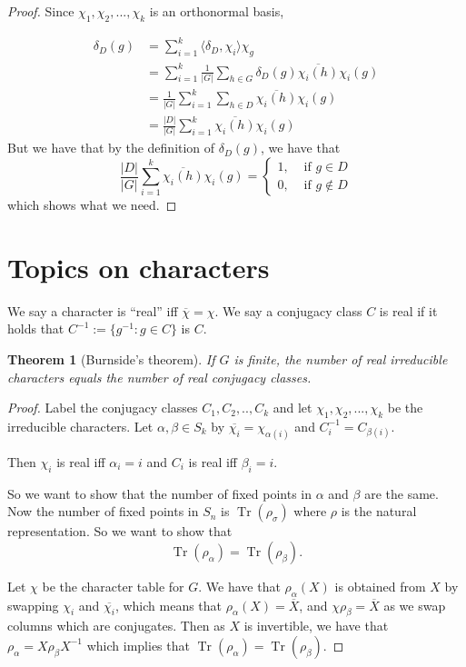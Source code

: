 \documentclass[]{report}
\newtheorem{theorem}{Theorem}
\theoremstyle{definition}
\numberwithin{theorem}{section}
\numberwithin{equation}{section}
\newcommand{\tr}{\operatorname{Tr}}
\begin{document}
\begin{proof}
	Since $\chi_1, \chi_2, ..., \chi_k$ is an orthonormal basis,
	
	\begin{align*}
		\delta_D(g) &= \sum_{i = 1}^k \langle \delta_D, \chi_i \rangle \chi_g\\
		&= \sum_{i = 1}^k \frac{1}{|G|} \sum_{h \in G} \delta_D(g) \overline{\chi_i(h)} \chi_i(g)\\
		&= \frac{1}{|G|}\sum_{i = 1}^k \sum_{h \in D} \overline{\chi_i(h)} \chi_i(g)\\
		&= \frac{|D|}{|G|}\sum_{i = 1}^k \overline{\chi_i(h)} \chi_i(g)
	\end{align*}
	But we have that by the definition of $\delta_D(g)$, we have that 
	\begin{equation}
		\frac{|D|}{|G|}\sum_{i = 1}^k \overline{\chi_i(h)} \chi_i(g) = \begin{cases}
			1, & \text{ if } g \in D\\
			0, & \text{ if } g \notin D
		\end{cases}
	\end{equation}
	which shows what we need. 
\end{proof}
\section{Topics on characters}

We say a character is ``real'' iff $\overline{\chi} = \chi$. We say a conjugacy class $C$ is real if it holds that $C^{-1} := \{g^{-1}: g \in C\}$ is $C$.

\begin{theorem}[Burnside's theorem]
	If $G$ is finite, the number of real irreducible characters equals the number of real conjugacy classes.
\end{theorem}

\begin{proof}
	Label the conjugacy classes $C_1, C_2, .., C_k$ and let $\chi_1, \chi_2, ..., \chi_k$ be the irreducible characters. Let $\alpha, \beta \in S_k$ by $\overline{\chi_i} = \chi_{\alpha(i)}$ and $C_i^{-1} = C_{\beta(i)}$.
	
	Then $\chi_i$ is real iff $\alpha_i = i$ and $C_i$ is real iff $\beta_i = i$.
	
	So we want to show that the number of fixed points in $\alpha$ and $\beta$ are the same. Now the number of fixed points in $S_n$ is $\tr(\rho_\sigma)$ where $\rho$ is the natural representation. So we want to show that
	\begin{equation}
		\tr(\rho_\alpha) = \tr(\rho_\beta).
	\end{equation}
	
	Let $\chi$ be the character table for $G$. We have that $\rho_\alpha(X)$ is obtained from $X$ by swapping $\chi_i$ and $\overline{\chi_i}$, which means that $\rho_\alpha(X) = \overline{X}$, and $\chi \rho_\beta = \overline{X}$ as we swap columns which are conjugates. Then as $X$ is invertible, we have that $\rho_\alpha = X \rho_\beta X^{-1}$ which implies that $\tr(\rho_\alpha) = \tr(\rho_\beta)$. 
\end{proof}
\end{document}
